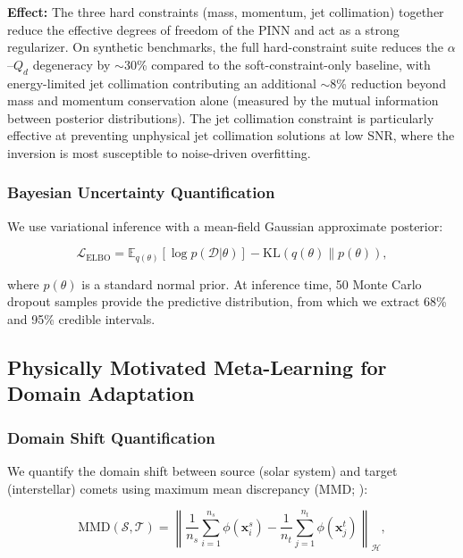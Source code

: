 \documentclass[usenatbib]{mnras}
\begin{document}
\textbf{Effect:} The three hard constraints (mass, momentum, jet collimation) together reduce the effective degrees of freedom of the PINN and act as a strong regularizer. On synthetic benchmarks, the full hard-constraint suite reduces the $\alpha$--$Q_d$ degeneracy by $\sim$30\% compared to the soft-constraint-only baseline, with energy-limited jet collimation contributing an additional $\sim$8\% reduction beyond mass and momentum conservation alone (measured by the mutual information between posterior distributions). The jet collimation constraint is particularly effective at preventing unphysical jet collimation solutions at low SNR, where the inversion is most susceptible to noise-driven overfitting.

\subsubsection{Bayesian Uncertainty Quantification}

We use variational inference with a mean-field Gaussian approximate posterior:

\begin{equation}\label{eq:elbo}
\mathcal{L}_{\text{ELBO}} = \mathbb{E}_{q(\theta)}[\log p(\mathcal{D}|\theta)] - \text{KL}(q(\theta) \| p(\theta)),
\end{equation}

where $p(\theta)$ is a standard normal prior. At inference time, 50 Monte Carlo dropout samples \citep{gal16} provide the predictive distribution, from which we extract 68\% and 95\% credible intervals.

\subsection{Physically Motivated Meta-Learning for Domain Adaptation}\label{sec:domain_adapt}

\subsubsection{Domain Shift Quantification}

We quantify the domain shift between source (solar system) and target (interstellar) comets using maximum mean discrepancy (MMD; \citealt{gretton12}):

\begin{equation}\label{eq:mmd}
\text{MMD}(\mathcal{S}, \mathcal{T}) = \left\| \frac{1}{n_s}\sum_{i=1}^{n_s} \phi(\mathbf{x}_i^s) - \frac{1}{n_t}\sum_{j=1}^{n_t} \phi(\mathbf{x}_j^t) \right\|_{\mathcal{H}},
\end{equation}
\end{document}
